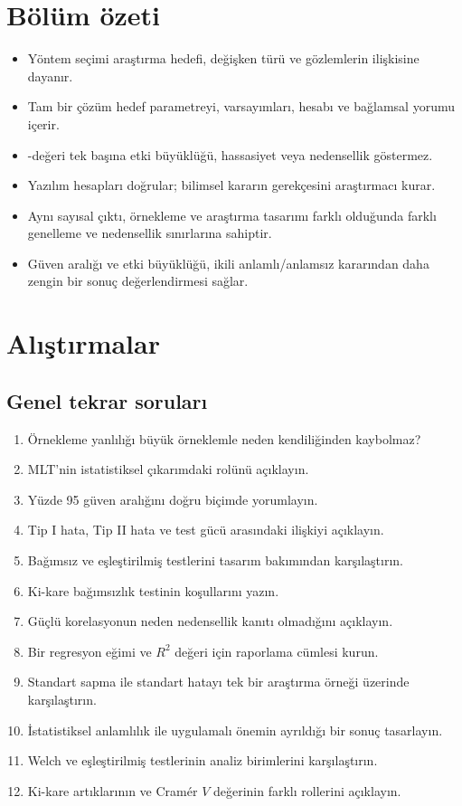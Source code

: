 \section{Bölüm özeti}

\begin{itemize}
  \item Yöntem seçimi araştırma hedefi, değişken türü ve gözlemlerin ilişkisine dayanır.
  \item Tam bir çözüm hedef parametreyi, varsayımları, hesabı ve bağlamsal yorumu içerir.
  \item \pval-değeri tek başına etki büyüklüğü, hassasiyet veya nedensellik göstermez.
  \item Yazılım hesapları doğrular; bilimsel kararın gerekçesini araştırmacı kurar.
  \item Aynı sayısal çıktı, örnekleme ve araştırma tasarımı farklı olduğunda
  farklı genelleme ve nedensellik sınırlarına sahiptir.
  \item Güven aralığı ve etki büyüklüğü, ikili anlamlı/anlamsız kararından
  daha zengin bir sonuç değerlendirmesi sağlar.
\end{itemize}


\section*{Alıştırmalar}

\subsection*{Genel tekrar soruları}

\begin{enumerate}
  \item Örnekleme yanlılığı büyük örneklemle neden kendiliğinden kaybolmaz?
  \item MLT'nin istatistiksel çıkarımdaki rolünü açıklayın.
  \item Yüzde 95 güven aralığını doğru biçimde yorumlayın.
  \item Tip I hata, Tip II hata ve test gücü arasındaki ilişkiyi açıklayın.
  \item Bağımsız ve eşleştirilmiş \tstat testlerini tasarım bakımından karşılaştırın.
  \item Ki-kare bağımsızlık testinin koşullarını yazın.
  \item Güçlü korelasyonun neden nedensellik kanıtı olmadığını açıklayın.
  \item Bir regresyon eğimi ve $R^2$ değeri için raporlama cümlesi kurun.
  \item Standart sapma ile standart hatayı tek bir araştırma örneği üzerinde karşılaştırın.
  \item İstatistiksel anlamlılık ile uygulamalı önemin ayrıldığı bir sonuç tasarlayın.
  \item Welch ve eşleştirilmiş \tstat testlerinin analiz birimlerini karşılaştırın.
  \item Ki-kare artıklarının ve Cramér $V$ değerinin farklı rollerini açıklayın.
\end{enumerate}

